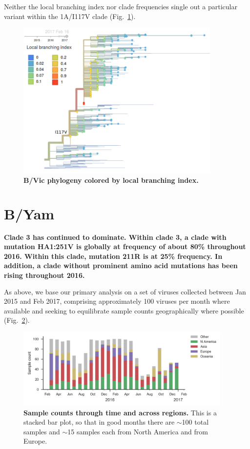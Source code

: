 \documentclass[11pt,oneside,letterpaper]{article}
\begin{document}
\pagebreak

Neither the local branching index nor clade frequencies single out a particular variant within the 1A/I117V clade (Fig.\ \ref{Vic_lbi}).

\begin{figure}[H]
	\centering
	\includegraphics[width=0.9\textwidth]{../figures/feb-2017/Vic_lbi.png}
	\caption{\textbf{B/Vic phylogeny colored by local branching index.}
	}
	\label{Vic_lbi}
\end{figure}

\clearpage
\pagebreak

\section*{B/Yam}

\textbf{Clade 3 has continued to dominate. Within clade 3, a clade with mutation HA1:251V is globally at frequency of about 80\% throughout 2016. Within this clade, mutation 211R is at 25\% frequency. In addition, a clade without prominent amino acid mutations has been rising throughout 2016.}

As above, we base our primary analysis on a set of viruses collected between Jan 2015 and Feb 2017, comprising approximately 100 viruses per month where available and seeking to equilibrate sample counts geographically where possible (Fig.\ \ref{Yam_counts}).

\begin{figure}[H]
	\centering
	\includegraphics[width=0.95\textwidth]{../figures/feb-2017/Yam_counts.png}
	\caption{\textbf{Sample counts through time and across regions.}
	This is a stacked bar plot, so that in good months there are $\sim$100 total samples and $\sim$15 samples each from North America and from Europe.
	}
	\label{Yam_counts}
\end{figure}
\end{document}
